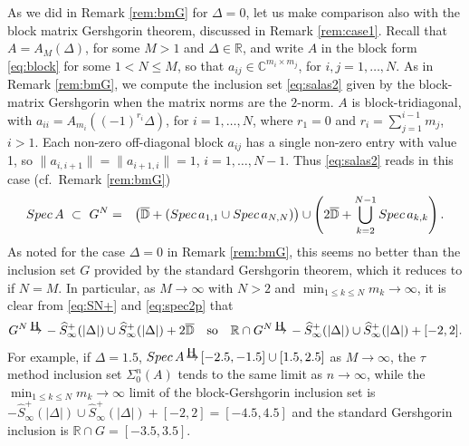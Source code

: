 \documentclass[preprint,1p,11pt]{elsarticle}
\newcommand\C{{\mathbb C}}
\newcommand\D{{\mathbb D}}
\newcommand\R{{\mathbb R}}
\newcommand\Spec{{\rm Spec}\,}  %
\newcommand\Specn{{\rm Spec}}   %
\newcommand\Hto{
   \unitlength0.1ex
   \begin{picture}(30,15)
   \put(13,16){\makebox(0,0)[]{\tiny\rm H}}
   \put(15,5){\makebox(0,0)[]{$\to$}}
   \end{picture}
}
\numberwithin{equation}{section}   %
\numberwithin{figure}{section}  %
\begin{document}
As we did in Remark \ref{rem:bmG} for $\Delta=0$, let us make comparison also with the block matrix Gershgorin theorem, discussed in Remark \ref{rem:case1}. Recall that $A=A_M(\Delta)$, for some $M>1$ and $\Delta\in \R$, and write $A$ in the block form \eqref{eq:block} for some $1<N\leq M$, so that  $a_{ij}\in \C^{m_i\times m_j}$, for $i,j=1,\ldots, N$. As in Remark \ref{rem:bmG}, we compute the inclusion set \eqref{eq:salas2} given by the block-matrix Gershgorin when the matrix norms are the $2$-norm. $A$ is block-tridiagonal, with $a_{ii} = A_{m_i}((-1)^{r_i}\Delta)$, for $i=1,\ldots,N$, where $r_1=0$ and $r_i= \sum_{j=1}^{i-1}m_j$, $i>1$. Each non-zero off-diagonal block $a_{ij}$ has a single non-zero entry with value 1, so $\|a_{i,i+1}\|=\|a_{i+1,i}\|=1$, $i=1,\ldots,N-1$. Thus \eqref{eq:salas2} reads in this case (cf.~Remark \ref{rem:bmG})
\begin{eqnarray*}
\Spec A\ \subset\ G^{N} %
&   = &\left(\overline{\D}+(\Spec a_{1,1} \cup \Spec a_{N,N})\right) \cup \left(2\overline{\D} +\bigcup_{k=2}^{N-1} \Spec a_{k,k}\right).
\end{eqnarray*}
As noted for the case $\Delta=0$ in Remark \ref{rem:bmG}, this seems no better than the inclusion set $G$ provided by the standard Gershgorin theorem, which it reduces to if $N=M$. In particular, as  $M\to\infty$ with $N>2$ and  $\min_{1\leq k\leq N} m_k\to\infty$, it is clear from \eqref{eq:SN+} and \eqref{eq:spec2p} that 
$$
G^{N}\Hto -\widehat S^+_\infty(|\Delta|)\cup \widehat S^+_\infty(|\Delta|) + 2\overline{\D} \quad \mbox{so} \quad \R\cap G^{N}\Hto -\widehat S^+_\infty(|\Delta|)\cup \widehat S^+_\infty(|\Delta|) + [-2,2].
$$
For example, if $\Delta=1.5$, $\Spec A \Hto [-2.5,-1.5]\cup [1.5,2.5]$ as $M\to\infty$, the $\tau$ method inclusion set $\Sigma_0^n(A)$ tends to the same limit as $n\to\infty$, while the $\min_{1\leq k\leq N} m_k\to\infty$ limit of the block-Gershgorin inclusion set is $-\widehat S^+_\infty(|\Delta|)\cup \widehat S^+_\infty(|\Delta|) + [-2,2]=[-4.5,4.5]$ and the standard Gershgorin inclusion is
$\R\cap G = [-3.5,3.5]$.
\end{document}
